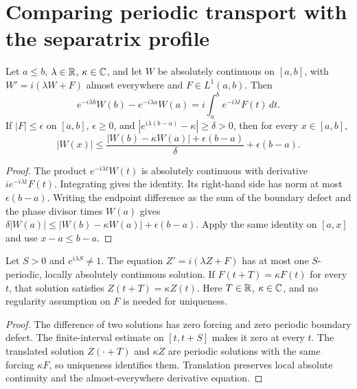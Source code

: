 \section{Comparing periodic transport with the separatrix profile}

\begin{lemma}
\label{lem:transport-boundary-estimate}
\leanok
Let $a\le b$, $\lambda\in\mathbb{R}$, $\kappa\in\mathbb{C}$, and let $W$ be absolutely
continuous on $[a,b]$, with $W'=i(\lambda W+F)$ almost everywhere and
$F\in L^1(a,b)$. Then
\[
 e^{-i\lambda b}W(b)-e^{-i\lambda a}W(a)
   =i\int_a^b e^{-i\lambda t}F(t)\,dt.
\]
If $|F|\le\epsilon$ on $[a,b]$, $\epsilon\ge0$, and
$|e^{i\lambda(b-a)}-\kappa|\ge\delta>0$, then for every $x\in[a,b]$,
\[
 |W(x)|\le
 \frac{|W(b)-\kappa W(a)|+\epsilon(b-a)}{\delta}+\epsilon(b-a).
\]
\end{lemma}

\begin{proof}
\leanok
The product $e^{-i\lambda t}W(t)$ is absolutely continuous with derivative
$i e^{-i\lambda t}F(t)$. Integrating gives the identity. Its right-hand side
has norm at most $\epsilon(b-a)$. Writing the endpoint difference as the
sum of the boundary defect and the phase divisor times $W(a)$ gives
$\delta|W(a)|\le |W(b)-\kappa W(a)|+\epsilon(b-a)$. Apply the same identity
on $[a,x]$ and use $x-a\le b-a$.
\end{proof}

\begin{lemma}
\label{lem:periodic-transport-character}
\leanok
Let $S>0$ and $e^{i\lambda S}\ne1$. The equation
$Z'=i(\lambda Z+F)$ has at most one $S$-periodic, locally absolutely
continuous solution. If $F(t+T)=\kappa F(t)$ for every $t$, that solution
satisfies $Z(t+T)=\kappa Z(t)$. Here $T\in\mathbb{R}$, $\kappa\in\mathbb{C}$, and no
regularity assumption on $F$ is needed for uniqueness.
\end{lemma}

\begin{proof}
\leanok
The difference of two solutions has zero forcing and zero periodic boundary
defect. The finite-interval estimate on $[t,t+S]$ makes it zero at every $t$.
The translated solution $Z(\cdot+T)$ and $\kappa Z$ are periodic solutions
with the same forcing $\kappa F$, so uniqueness identifies them. Translation
preserves local absolute continuity and the almost-everywhere derivative equation.
\end{proof}

